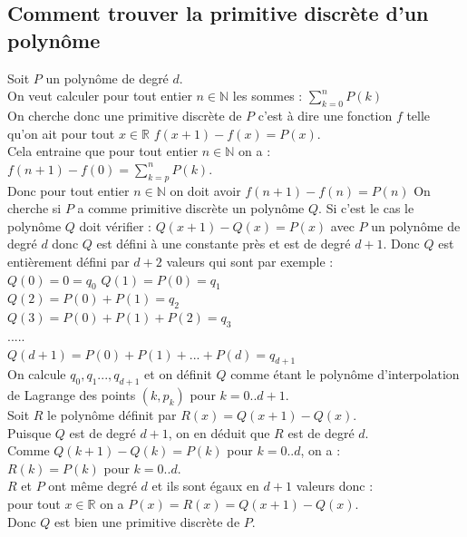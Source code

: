 \documentclass[a4paper,11pt]{book}
\newcommand{\R}{{\mathbb{R}}}
\newcommand{\N}{{\mathbb{N}}}
\begin{document}
\subsection{Comment trouver la primitive discr\`ete d'un polyn\^ome}
Soit $P$ un polyn\^ome de degr\'e $d$.\\
On veut calculer pour tout entier $n \in \N$ les sommes :
$\displaystyle \sum_{k=0}^nP(k)$\\
On cherche donc une primitive discr\`ete de $P$ c'est \`a dire une fonction $f$
telle qu'on ait pour tout $x \in \R$ $f(x+1)-f(x)=P(x)$.\\
Cela entraine que pour tout entier $n \in \N$ on a :\\
$\displaystyle f(n+1)-f(0)=\sum_{k=p}^nP(k)$.\\
Donc pour tout entier $n \in \N$ on doit avoir $\displaystyle f(n+1)-f(n)=P(n)$
On cherche si $P$ a comme primitive discr\`ete un polyn\^ome $Q$.
Si c'est le cas le polyn\^ome $Q$ doit v\'erifier : 
$Q(x+1)-Q(x)=P(x)$ avec $P$ un polyn\^ome de degr\'e $d$ donc $Q$ est d\'efini 
\`a une constante pr\`es et est de degr\'e $d+1$. Donc $Q$ est 
enti\`erement d\'efini par $d+2$ valeurs qui sont par exemple :\\
$Q(0)=0=q_0$
$Q(1)=P(0)=q_1$ \\
$Q(2)=P(0)+P(1)=q_2$ \\
$Q(3)=P(0)+P(1)+P(2)=q_3$ \\
.....\\
$Q(d+1)=P(0)+P(1)+...+P(d)=q_{d+1}$ \\
On calcule $q_0,q_1...,q_{d+1}$ et on d\'efinit $Q$ comme \'etant le polyn\^ome
d'interpolation de Lagrange des points $(k,p_k)$ pour $k=0..d+1$.\\
Soit $R$ le polyn\^ome d\'efinit par $R(x)=Q(x+1)-Q(x)$.\\
Puisque $Q$ est de degr\'e $d+1$, on en d\'eduit que $R$ est de degr\'e $d$.\\
Comme $\displaystyle Q(k+1)-Q(k)=P(k)$ pour $k=0..d$, on a :\\
$R(k)=P(k)$ pour $k=0..d$.\\
$R$ et $P$ ont m\^eme degr\'e $d$ et ils sont \'egaux en $d+1$ valeurs donc :\\
pour tout $x \in \R$ on a $P(x)=R(x)=Q(x+1)-Q(x)$.\\
Donc $Q$ est bien une primitive discr\`ete de $P$.
\end{document}
